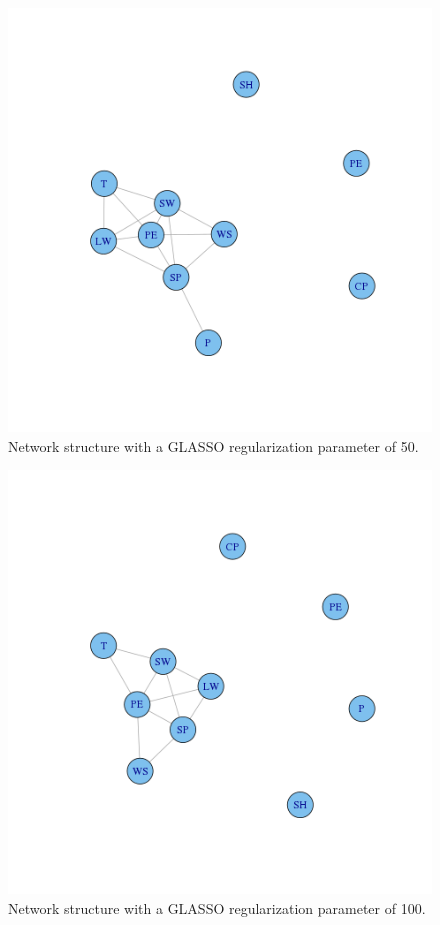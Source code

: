 \documentclass{article}
\begin{document}
\begin{figure}
\includegraphics[width=0.9\columnwidth]{images/data_50.png}
\caption{Network structure with a GLASSO regularization parameter of 50.}
\label{fig:data_50}
\end{figure}

\begin{figure}
\includegraphics[width=0.9\columnwidth]{images/data_100.png}
\caption{Network structure with a GLASSO regularization parameter of 100.}
\label{fig:data_100}
\end{figure}
\end{document}
